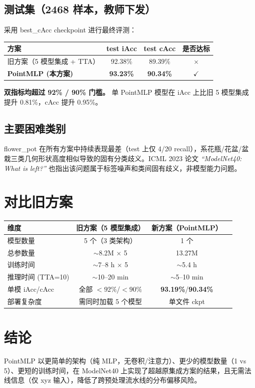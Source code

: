 \documentclass[10pt,a4paper]{ctexart}
\begin{document}
\subsection{测试集（2468 样本，教师下发）}

采用 best\_cAcc checkpoint 进行最终评测：

\begin{center}\small
\begin{tabular}{lccc}
\toprule
方案 & test iAcc & test cAcc & 是否达标 \\
\midrule
旧方案（5 模型集成 + TTA）& 92.38\% & 89.39\% & $\times$ \\
\textbf{PointMLP (本方案)} & \textbf{93.23\%} & \textbf{90.34\%} & \textbf{$\checkmark$} \\
\bottomrule
\end{tabular}
\end{center}

\textbf{双指标均超过 92\% / 90\% 门槛。} 单 PointMLP 模型在 iAcc 上比旧 5 模型集成提升 0.81\%，cAcc 提升 0.95\%。

\subsection{主要困难类别}

flower\_pot 在所有方案中持续表现最差（test 上仅 4/20 recall），系花瓶/花盆/盆栽三类几何形状高度相似导致的固有分类歧义。ICML 2023 论文 \textit{``ModelNet40: What is left?''} 也指出该问题属于标签噪声和类间固有歧义，非模型能力问题。

\section{对比旧方案}

\begin{center}\small
\begin{tabular}{lccc}
\toprule
维度 & 旧方案（5 模型集成） & 新方案（PointMLP） \\
\midrule
模型数量 & 5 个（3 类架构） & 1 个 \\
总参数量 & $\sim$8.2M × 5 & 13.27M \\
训练时间 & $\sim$7--8 h $\times$ 5 & $\sim$5.4 h \\
推理时间 (TTA=10) & $\sim$10--20 min & $\sim$5--10 min \\
单模 iAcc/cAcc & 全部 $<92\%$/$<90\%$ & \textbf{93.19\%}/\textbf{90.34\%} \\
部署复杂度 & 需同时加载 5 个模型 & 单文件 ckpt \\
\bottomrule
\end{tabular}
\end{center}

\section{结论}

PointMLP 以更简单的架构（纯 MLP，无卷积/注意力）、更少的模型数量（1 vs 5）、更短的训练时间，在 ModelNet40 上实现了超越原集成方案的结果，且无需法线信息（仅 xyz 输入），降低了跨预处理流水线的分布偏移风险。
\end{document}
